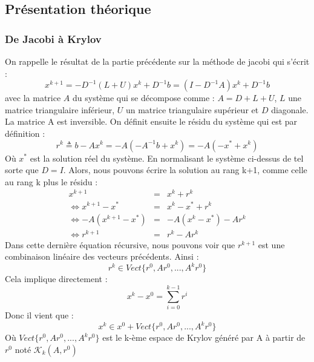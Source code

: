 \subsection{Présentation théorique}
\subsubsection{De Jacobi à Krylov}
On rappelle le résultat de la partie précédente sur la méthode de jacobi qui s'écrit : 
\begin{equation}
x^{k+1} = -D^{-1}(L+U)x^k + D^{-1}b = (I - D^{-1}A)x^{k} + D^{-1}b
\end{equation}
avec la matrice $A$ du système qui se décompose comme : $A = D + L + U$, $L$ une matrice triangulaire inférieur, $U$ un matrice triangulaire supérieur et $D$ diagonale. La matrice A est inversible. On définit ensuite le résidu du système qui est par définition : 
\begin{equation}
r^k \triangleq b - Ax^k = -A ( - A^{-1}b + x^k) = -A (- x^* + x^k)
\end{equation}
Où $x^*$ est la solution réel du système. En normalisant le système ci-dessus de tel sorte que $D = I$. Alors, nous pouvons écrire la solution au rang k+1, comme celle au rang k plus le résidu : 
\begin{eqnarray}
x^{k+1} &=& x^k + r^k\\
\Leftrightarrow x^{k+1} - x^* &=& x^k - x^* + r^k\\
\Leftrightarrow -A( x^{k+1} - x^*) &=& -A(x^k - x^*) - Ar^k\\
\Leftrightarrow r^{k+1} &=& r^k - Ar^k
\end{eqnarray}
Dans cette dernière équation récursive, nous pouvons voir que $r^{k+1}$ est une combinaison linéaire des vecteurs précédents. Ainsi :
\begin{equation}
r^k \in Vect\{r^0, Ar^0, ..., A^kr^0\}
\end{equation}
Cela implique directement : 
\begin{equation}
x^k - x^0 = \sum_{i = 0}^{k-1}r^i
\end{equation}
Donc il vient que : 
\begin{equation}
x^k \in x^0 + Vect\{r^0, Ar^0, ..., A^kr^0\}
\end{equation}
Où $Vect\{r^0, Ar^0, ..., A^kr^0\}$ est le k-ème espace de Krylov généré par A à partir de $r^0$ noté $\mathcal{K}_k(A, r^0)$
